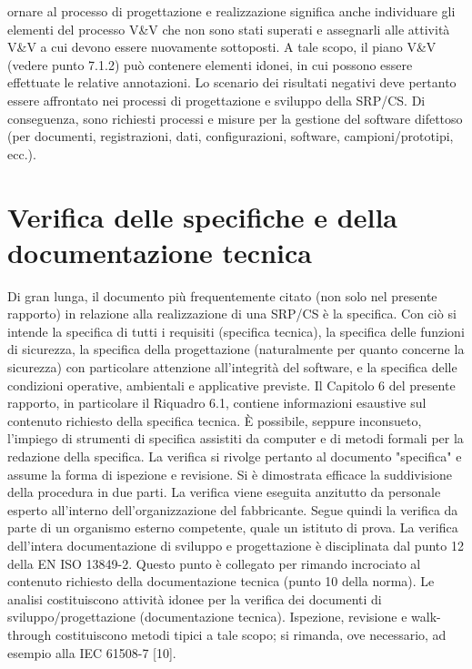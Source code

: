 ornare al processo di progettazione e realizzazione significa anche individuare gli elementi del processo V\&V che non sono stati superati e assegnarli alle attività V\&V a cui devono essere nuovamente sottoposti. A tale scopo, il piano V\&V (vedere punto 7.1.2) può contenere elementi idonei, in cui possono essere effettuate le relative annotazioni.
Lo scenario dei risultati negativi deve pertanto essere affrontato nei processi di progettazione e sviluppo della SRP/CS. Di conseguenza, sono richiesti processi e misure per la gestione del software difettoso (per documenti, registrazioni, dati, configurazioni, software, campioni/prototipi, ecc.).

\section{Verifica delle specifiche e della documentazione tecnica}
\label{subsec:07-2}
Di gran lunga, il documento più frequentemente citato (non solo nel presente rapporto) in relazione alla realizzazione di una SRP/CS è la specifica. Con ciò si intende la specifica di tutti i requisiti (specifica tecnica), la specifica delle funzioni di sicurezza, la specifica della progettazione (naturalmente per quanto concerne la sicurezza) con particolare attenzione all'integrità del software, e la specifica delle condizioni operative, ambientali e applicative previste. Il Capitolo 6 del presente rapporto, in particolare il Riquadro 6.1, contiene informazioni esaustive sul contenuto richiesto della specifica tecnica. È possibile, seppure inconsueto, l'impiego di strumenti di specifica assistiti da computer e di metodi formali per la redazione della specifica.
La verifica si rivolge pertanto al documento "specifica" e assume la forma di ispezione e revisione. Si è dimostrata efficace la suddivisione della procedura in due parti. La verifica viene eseguita anzitutto da personale esperto all'interno dell'organizzazione del fabbricante. Segue quindi la verifica da parte di un organismo esterno competente, quale un istituto di prova.
La verifica dell'intera documentazione di sviluppo e progettazione è disciplinata dal punto 12 della EN ISO 13849-2. Questo punto è collegato per rimando incrociato al contenuto richiesto della documentazione tecnica (punto 10 della norma). Le analisi costituiscono attività idonee per la verifica dei documenti di sviluppo/progettazione (documentazione tecnica). Ispezione, revisione e walk-through costituiscono metodi tipici a tale scopo; si rimanda, ove necessario, ad esempio alla IEC 61508-7 [10].

